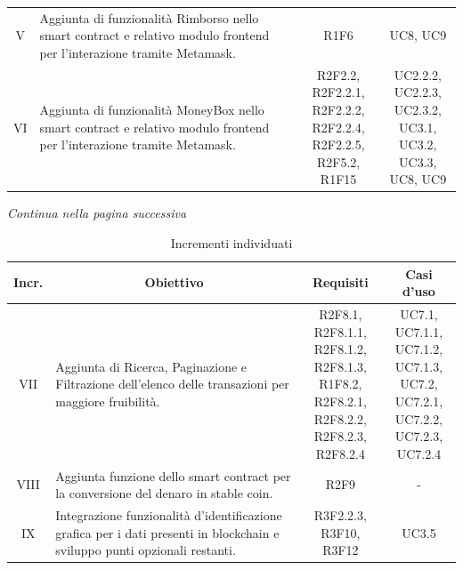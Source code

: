 \begin{table}[H]
\begin{tabular}{c|p{6cm}|c|c}
    V	& Aggiunta di funzionalità Rimborso nello smart contract\glo{} e relativo modulo frontend\glo{} per l'interazione tramite Metamask\glo{}. & R1F6 & UC8, UC9 \\
    VI & Aggiunta di funzionalità MoneyBox\glo{} nello smart contract\glo{} e relativo modulo frontend\glo{} per l'interazione tramite Metamask\glo{}. & \Shortunderstack{R2F2.2, R2F2.2.1,\\R2F2.2.2, R2F2.2.4,\\R2F2.2.5, R2F5.2,\\R1F15\\} & \Shortunderstack{UC2.2.2, UC2.2.3,\\UC2.3.2, UC3.1,\\UC3.2, UC3.3,\\UC8, UC9\\}\\
  \end{tabular}
\end{table}
\begin{center}
  \textit{\small Continua nella pagina successiva}
\end{center}
\begin{table}[H]
  \centering
  \renewcommand{\arraystretch}{1.8}
  \begin{tabular}{c|p{6cm}|c|c}
    \rowcolor[HTML]{125E28}
    \color[HTML]{FFFFFF}\textbf{Incr.}
    & \multicolumn{1}{c}{\color[HTML]{FFFFFF}\textbf{Obiettivo}}
    & \multicolumn{1}{c}{\color[HTML]{FFFFFF}\textbf{Requisiti}}
    & \multicolumn{1}{c}{\color[HTML]{FFFFFF}\textbf{Casi d'uso}}\\
    \hline
    VII	& Aggiunta di Ricerca, Paginazione e Filtrazione dell'elenco delle transazioni per maggiore fruibilità. & \Shortunderstack{R2F8.1, R2F8.1.1,\\R2F8.1.2, R2F8.1.3,\\R1F8.2, R2F8.2.1,\\R2F8.2.2, R2F8.2.3,\\R2F8.2.4\\} & \Shortunderstack{UC7.1, UC7.1.1,\\UC7.1.2, UC7.1.3,\\UC7.2, UC7.2.1,\\UC7.2.2, UC7.2.3,\\UC7.2.4\\} \\
    VIII & Aggiunta funzione dello smart contract\glo{} per la conversione del denaro in stable coin\glo{}. & R2F9 & - \\
    IX & Integrazione funzionalità d'identificazione grafica per i dati presenti in blockchain\glo{} e sviluppo punti opzionali restanti. & \Shortunderstack{R3F2.2.3, R3F10,\\R3F12\\} & UC3.5 \\
  \end{tabular}
  \caption{Incrementi individuati}
\end{table}